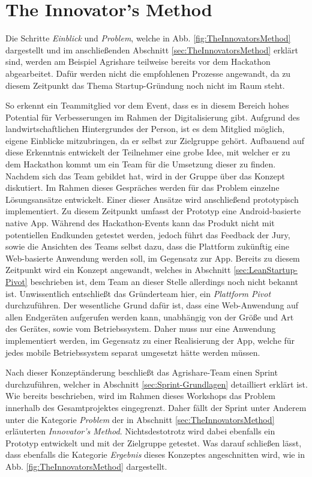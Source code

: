 \section{The Innovator's Method}
Die Schritte \textit{Einblick} und \textit{Problem}, welche in Abb. \ref{fig:TheInnovatorsMethod} dargestellt und im anschließenden Abschnitt \ref{sec:TheInnovatorsMethod} erklärt sind, werden am Beispiel Agrishare teilweise bereits vor dem Hackathon abgearbeitet. Dafür werden nicht die empfohlenen Prozesse angewandt, da zu diesem Zeitpunkt das Thema Startup-Gründung noch nicht im Raum steht.

So erkennt ein Teammitglied vor dem Event, dass es in diesem Bereich hohes Potential für Verbesserungen im Rahmen der Digitalisierung gibt. Aufgrund des landwirtschaftlichen Hintergrundes der Person, ist es dem Mitglied möglich, eigene Einblicke mitzubringen, da er selbst zur Zielgruppe gehört. Aufbauend auf diese Erkenntnis entwickelt der Teilnehmer eine grobe Idee, mit welcher er zu dem Hackathon kommt um ein Team für die Umsetzung dieser zu finden. Nachdem sich das Team gebildet hat, wird in der Gruppe über das Konzept diskutiert. Im Rahmen dieses Gespräches werden für das Problem einzelne Lösungsansätze entwickelt. Einer dieser Ansätze wird anschließend prototypisch implementiert. Zu diesem Zeitpunkt umfasst der Prototyp eine Android-basierte native App. Während des Hackathon-Events kann das Produkt nicht mit potentiellen Endkunden getestet werden, jedoch führt das Feedback der Jury, sowie die Ansichten des Teams selbst dazu, dass die Plattform zukünftig eine Web-basierte Anwendung werden soll, im Gegensatz zur App. Bereits zu diesem Zeitpunkt wird ein Konzept angewandt, welches in Abschnitt \ref{sec:LeanStartup-Pivot} beschrieben ist, dem Team an dieser Stelle allerdings noch nicht bekannt ist. Unwissentlich entschließt das Gründerteam hier, ein \textit{Plattform Pivot} durchzuführen. Der wesentliche Grund dafür ist, dass eine Web-Anwendung auf allen Endgeräten aufgerufen werden kann, unabhängig von der Größe und Art des Gerätes, sowie vom Betriebssystem. Daher muss nur eine Anwendung implementiert werden, im Gegensatz zu einer Realisierung der App, welche für jedes mobile Betriebssystem separat umgesetzt hätte werden müssen.

Nach dieser Konzeptänderung beschließt das Agrishare-Team einen Sprint durchzuführen, welcher in Abschnitt \ref{sec:Sprint-Grundlagen} detailliert erklärt ist. Wie bereits beschrieben, wird im Rahmen dieses Workshops das Problem innerhalb des Gesamtprojektes eingegrenzt. Daher fällt der Sprint unter Anderem unter die Kategorie \textit{Problem} der in Abschnitt \ref{sec:TheInnovatorsMethod} erläuterten \textit{Innovator's Method}. Nichtsdestotrotz wird dabei ebenfalls ein Prototyp entwickelt und mit der Zielgruppe getestet. Was darauf schließen lässt, dass ebenfalls die Kategorie \textit{Ergebnis} dieses Konzeptes angeschnitten wird, wie in Abb. \ref{fig:TheInnovatorsMethod} dargestellt.